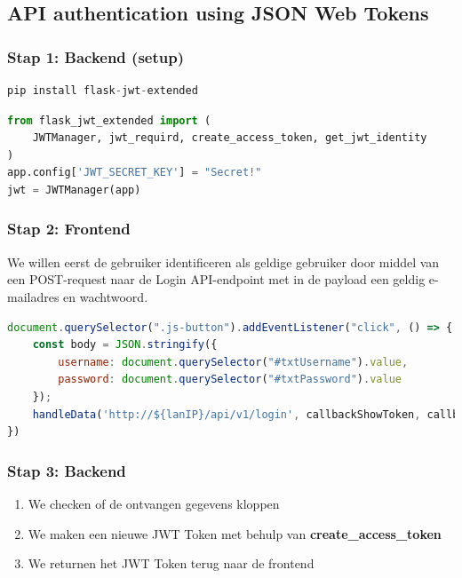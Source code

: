 \documentclass{article}
\newcommand{\bold}[1]{\textbf{#1}}
\begin{document}
\subsection{API authentication using JSON Web Tokens}
\subsubsection{Stap 1: Backend (setup)}
\begin{lstlisting}[language=Python]
pip install flask-jwt-extended
\end{lstlisting}


\begin{lstlisting}[language=Python]
from flask_jwt_extended import (
    JWTManager, jwt_requird, create_access_token, get_jwt_identity
)
app.config['JWT_SECRET_KEY'] = "Secret!"
jwt = JWTManager(app)
\end{lstlisting}

\subsubsection{Stap 2: Frontend}

We willen eerst de gebruiker identificeren als geldige gebruiker door middel van een
POST-request naar de Login API-endpoint met in de payload een geldig e-mailadres en wachtwoord.

\begin{lstlisting}[language=JavaScript]
document.querySelector(".js-button").addEventListener("click", () => {
    const body = JSON.stringify({
        username: document.querySelector("#txtUsername").value,
        password: document.querySelector("#txtPassword").value
    });
    handleData('http://${lanIP}/api/v1/login', callbackShowToken, callbackShowErrorNoLogin, "POST", body);
})
\end{lstlisting}

\subsubsection{Stap 3: Backend}
\begin{enumerate}
    \item We checken of de ontvangen gegevens kloppen
    \item We maken een nieuwe JWT Token met behulp van \bold{create\_access\_token}
    \item We returnen het JWT Token terug naar de frontend
\end{enumerate}
\end{document}
